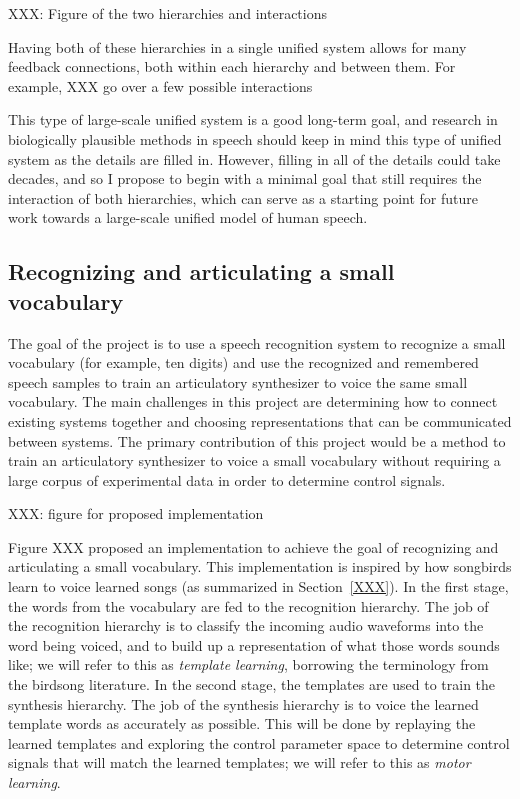 \documentclass{article}
\begin{document}
XXX: Figure of the two hierarchies and interactions

Having both of these hierarchies
in a single unified system
allows for many feedback connections,
both within each hierarchy
and between them.
For example,
XXX go over a few possible interactions

This type of large-scale unified system
is a good long-term goal,
and research in biologically plausible
methods in speech should keep in mind
this type of unified system
as the details are filled in.
However, filling in all of the details
could take decades,
and so I propose to begin
with a minimal goal that still
requires the interaction of both hierarchies,
which can serve as a starting point
for future work towards a large-scale
unified model of human speech.

\subsection{Recognizing and articulating a small vocabulary}

The goal of the project is to
use a speech recognition system
to recognize a small vocabulary
(for example, ten digits)
and use the recognized and remembered
speech samples to train
an articulatory synthesizer
to voice the same small vocabulary.
The main challenges in this project
are determining how to connect
existing systems together
and choosing representations that
can be communicated between systems.
The primary contribution of this project
would be a method to train an
articulatory synthesizer
to voice a small vocabulary
without requiring a large corpus
of experimental data
in order to determine control signals.

XXX: figure for proposed implementation

Figure XXX proposed an implementation
to achieve the goal of recognizing
and articulating a small vocabulary.
This implementation is inspired by
how songbirds learn to voice
learned songs (as summarized in Section~\ref{XXX}).
In the first stage, the words from
the vocabulary are fed to the
recognition hierarchy.
The job of the recognition hierarchy
is to classify the incoming
audio waveforms into the word
being voiced,
and to build up a representation
of what those words sounds like;
we will refer to this as
\textit{template learning},
borrowing the terminology
from the birdsong literature.
In the second stage, the templates
are used to train the
synthesis hierarchy.
The job of the synthesis hierarchy
is to voice the learned template words
as accurately as possible.
This will be done by replaying
the learned templates and
exploring the control parameter space
to determine control signals
that will match the learned templates;
we will refer to this as
\textit{motor learning}.
\end{document}
